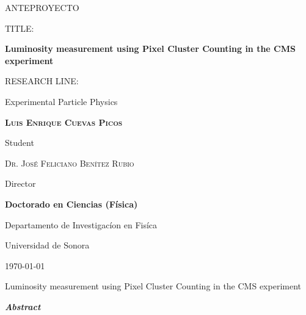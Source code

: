 \documentclass[final,12p]{article}
\def\Student{Luis Enrique Cuevas  Picos}
\def\Title{ANTEPROYECTO}
\def\Prog{Doctorado en Ciencias (F\'{i}sica) }
\def\Dept{Departamento de Investigac\'{i}on en Fis\'{i}ca}
\def\Institution{Universidad de Sonora}
\def\Director{Dr. Jos\'{e} Feliciano Ben\'{i}tez Rubio}
\def\ProjectTitle{Luminosity measurement using Pixel Cluster Counting in the CMS experiment}
\def\ResearchLine{Experimental Particle Physics}
\begin{document}
\onehalfspacing

\begin{titlepage}
\centering
\hspace{0pt}
\vfill
{\scshape\Large \Title \par}
  
  \vspace{2cm}
  {
    TITLE:\par
    {\bf \large \ProjectTitle \par}
  }
       
  \vspace{0.5cm}
  {
    RESEARCH LINE: \par
    \ResearchLine \par
  }
        
  \vspace{4cm}
  {\underline{\hspace{8cm}}\par}
  {\bf \scshape \Student \par}
  {Student\par}

  \vspace{1cm}
  {\underline{\hspace{8cm}}\par}
  {\scshape \Director \par}
  {Director\par}

  \vspace{1cm}
  {\bf \Prog \par}
  {\Dept \par}
  {\Institution \par}

  \vspace{4cm}
  {\today}

\hspace{0pt}
\vfill

\end{titlepage}


\shipout\null


\newpage
\hspace{2pt}
\vfill

  \begin{center}
    {\Large \ProjectTitle \par}
    \vspace{1cm}
    {\itshape\textbf{Abstract}\par}
  \end{center}
  
\end{document}
